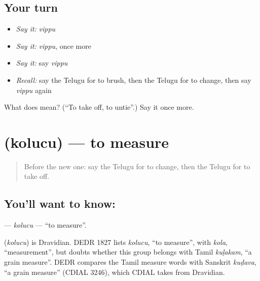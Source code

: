 \subsection*{Your turn}
\begin{itemize}
\raggedright
  \item \emph{Say it:} \emph{vippu}
  \item \emph{Say it:} \emph{vippu}, once more
  \item \emph{Say it:} say \emph{vippu}
  \item \emph{Recall:} say the Telugu for to brush, then the Telugu for to change, then say \emph{vippu} again
\end{itemize}

\begin{tcolorbox}[breakable,colback=teal!4,colframe=teal!35!black,title={Before you move on}]
What does  mean? (\textquotedblleft{}To take off, to untie\textquotedblright{}.) Say it once more.
\end{tcolorbox}
\section[\texorpdfstring{\te{కొలుచు} (kolucu)}{కొలుచు (kolucu)}]{ (kolucu) — to measure}

\label{lesson:TE-C158-kolucu}



\begin{quote}
Before the new one: say the Telugu for to change, then the Telugu for to take off.
\end{quote}

\subsection*{You'll want to know: }
\textbf{} — \emph{kolucu} — \textquotedblleft{}to measure\textquotedblright{}.

\begin{cousinweb}
\textbf{} (\emph{kolucu}) is Dravidian. DEDR 1827 lists \emph{kolucu}, \textquotedblleft{}to measure\textquotedblright{}, with \emph{kola}, \textquotedblleft{}measurement\textquotedblright{}, but doubts whether this group belongs with Tamil \emph{kuḷakam}, \textquotedblleft{}a grain measure\textquotedblright{}. DEDR compares the Tamil measure words with Sanskrit \emph{kuḍava}, \textquotedblleft{}a grain measure\textquotedblright{} (CDIAL 3246), which CDIAL takes from Dravidian.
\end{cousinweb}

